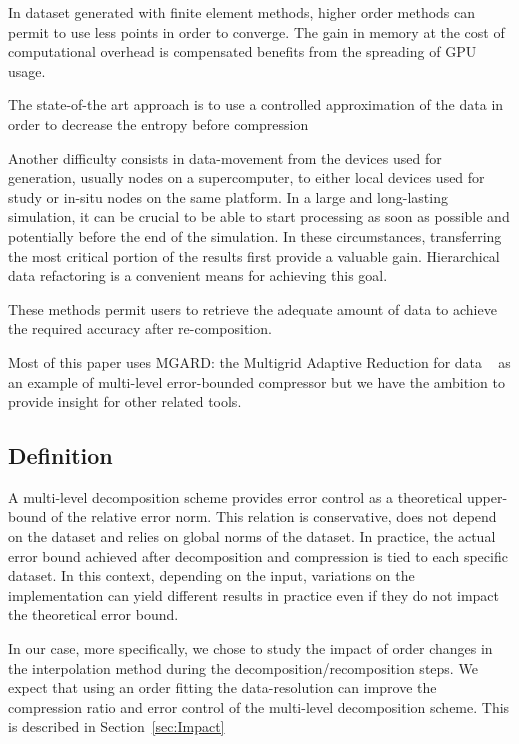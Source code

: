 \documentclass[conference]{IEEEtran}
\theoremstyle{remark}
\begin{document}
In dataset generated with finite element methods, higher order methods can permit to use less points in order to converge.
The gain in memory at the cost of computational overhead is compensated benefits from the spreading of GPU usage.%

The state-of-the art approach is to use a controlled approximation of the data in order to decrease the entropy before compression~\cite{lindstrom2014fixed,di2016fast,ainsworth2018multilevel}

Another difficulty consists in data-movement from the devices used for generation, usually nodes on a supercomputer, to either local devices used for study or in-situ nodes on the same platform. %
In a large and long-lasting simulation, it can be crucial to be able to start processing as soon as possible and potentially before the end of the simulation.
In these circumstances, transferring the most critical portion of the results first provide a valuable gain.
Hierarchical data refactoring is a convenient means for achieving this goal.

These methods permit users to retrieve the adequate amount of data to achieve the required accuracy after re-composition.

Most of this paper uses MGARD: the Multigrid Adaptive Reduction for data ~\cite{ainsworth2018multilevel,ainsworth2019multilevel,ainsworth20quantitative} as an example of multi-level error-bounded compressor but we have the ambition to provide insight for other related tools. %


\subsection{Definition}
A multi-level decomposition scheme provides error control as a theoretical upper-bound of the relative error norm. This relation is conservative, does not depend on the dataset and relies on global norms of the dataset. 
In practice, the actual error bound achieved after decomposition and compression is tied to each specific dataset. In this context, depending on the input, variations on the implementation can yield different results in practice even if they do not impact the theoretical error bound.

In our case, more specifically, we chose to study the impact of order changes in the interpolation method during the decomposition/recomposition steps.
We expect %
that using an order fitting the data-resolution can improve the compression ratio and error control of the multi-level decomposition scheme. This is described in Section~\ref{sec:Impact}
\end{document}
